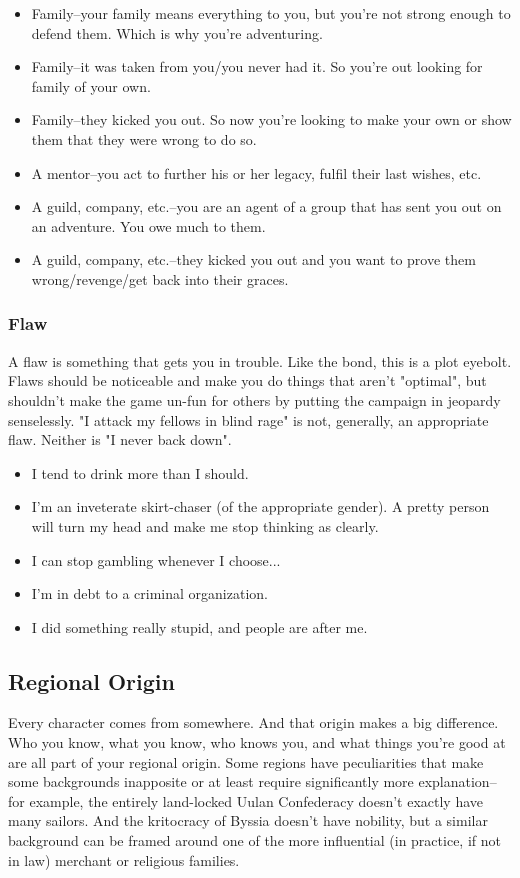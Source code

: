 \documentclass[draft]{article}
\begin{document}
\begin{itemize}
	\item Family--your family means everything to you, but you're not strong enough to defend them. Which is why you're adventuring.
	\item Family--it was taken from you/you never had it. So you're out looking for family of your own.
	\item Family--they kicked you out. So now you're looking to make your own or show them that they were wrong to do so.
	\item A mentor--you act to further his or her legacy, fulfil their last wishes, etc.
	\item A guild, company, etc.--you are an agent of a group that has sent you out on an adventure. You owe much to them.
	\item A guild, company, etc.--they kicked you out and you want to prove them wrong/revenge/get back into their graces.
\end{itemize}

\subsubsection{Flaw}
A flaw is something that gets you in trouble. Like the bond, this is a plot eyebolt. Flaws should be noticeable and make you do things that aren't "optimal", but shouldn't make the game un-fun for others by putting the campaign in jeopardy senselessly. "I attack my fellows in blind rage" is not, generally, an appropriate flaw. Neither is "I never back down".

\begin{itemize}
	\item I tend to drink more than I should.
	\item I'm an inveterate skirt-chaser (of the appropriate gender). A pretty person will turn my head and make me stop thinking as clearly.
	\item I can stop gambling whenever I choose...
	\item I'm in debt to a criminal organization.
	\item I did something really stupid, and people are after me.
\end{itemize}

\subsection{Regional Origin}
Every character comes from somewhere. And that origin makes a big difference. Who you know, what you know, who knows you, and what things you're good at are all part of your regional origin. Some regions have peculiarities that make some backgrounds inapposite or at least require significantly more explanation--for example, the entirely land-locked Uulan Confederacy doesn't exactly have many sailors. And the kritocracy of Byssia doesn't have nobility, but a similar background can be framed around one of the more influential (in practice, if not in law) merchant or religious families.
\end{document}
